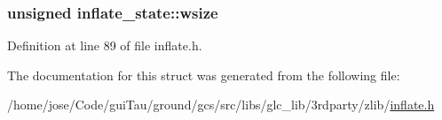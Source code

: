 \hypertarget{structinflate__state_acca16ca86216760eaf307bf71e15e470}{
\subsubsection[{wsize}]{\setlength{\rightskip}{0pt plus 5cm}unsigned inflate\-\_\-state\-::wsize}}\label{structinflate__state_acca16ca86216760eaf307bf71e15e470}


Definition at line 89 of file inflate.\-h.



The documentation for this struct was generated from the following file\-:\begin{DoxyCompactItemize}
\item 
/home/jose/\-Code/gui\-Tau/ground/gcs/src/libs/glc\-\_\-lib/3rdparty/zlib/\hyperlink{inflate_8h}{inflate.\-h}\end{DoxyCompactItemize}
